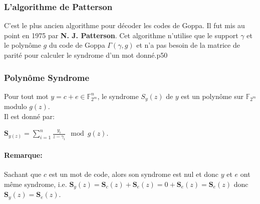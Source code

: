 \documentclass[12pt,openany]{report}
\begin{document}
 \subsubsection{L'algorithme de Patterson}
 C'est le plus ancien algorithme pour décoder les codes de Goppa. Il fut mis au point en 1975 par \textbf{N. J. Patterson}. Cet algorithme n'utilise que le support $\gamma$ et le polynôme $g$ du code de Goppa $\Gamma(\gamma,g)$ et n'a pas besoin de la matrice de parité pour calculer le syndrome d'un mot donné.\cite{Ndollane}p50
 \subsubsection{Polynôme Syndrome}
 Pour tout mot $ y= c+ e \in \mathbb{F}_{2^m}^n$, le syndrome $\mathit{S}_y(z)$ de $y$ est un polynôme sur $\mathbb{F}_{2^m}$ modulo $g(z)$.\\
 Il est donné par:
 
 \begin{center}
 
 $\mathbf{S}_{y(z)}=\sum_{i=1}^{n} \frac{y_i}{z-\gamma_i} \mod g(z)   $.
 \end{center}
 
 \paragraph{Remarque:\\}
 Sachant que $c$ est un mot de code, alors son syndrome est nul et donc $y$ et $e$ ont même syndrome, i.e. $\mathbf{S}_{y}(z)=\mathbf{S}_{c}(z)+\mathbf{S}_{e}(z)=0+\mathbf{S}_{e}(z) =\mathbf{S}_{e}(z)$ donc $\mathbf{S}_{y}(z)=\mathbf{S}_{e}(z)$.
\end{document}
